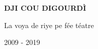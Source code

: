 \cleardoublepage
\thispagestyle{empty}

\vspace*{\fill}

\begin{center}
{\huge\bfseries DJI COU DIGOURDÌ\par}
\vspace{0.8em}
{\large La voya de riye pe fée téatre\par
2009 - 2019}
\end{center}

\vspace*{\fill}



\newpage
\thispagestyle{empty}

\begingroup
\setlength{\parindent}{0pt}
\small

